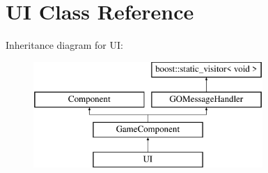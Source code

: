 \hypertarget{class_u_i}{}\section{UI Class Reference}
\label{class_u_i}
Inheritance diagram for UI\+:\begin{figure}[H]
\begin{center}
\leavevmode
\includegraphics[height=4.000000cm]{class_u_i}
\end{center}
\end{figure}
